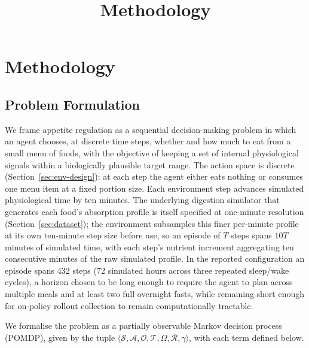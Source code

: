 \documentclass[10pt,twocolumn]{article}
\title{Methodology}
\author{}
\date{}
\begin{document}
\maketitle

\section{Methodology}

\subsection{Problem Formulation}
\label{sec:problem-formulation}

We frame appetite regulation as a sequential decision-making problem in which an agent chooses, at discrete time steps, whether and how much to eat from a small menu of foods, with the objective of keeping a set of internal physiological signals within a biologically plausible target range. The action space is discrete (Section~\ref{sec:env-design}): at each step the agent either eats nothing or consumes one menu item at a fixed portion size. Each environment step advances simulated physiological time by ten minutes. The underlying digestion simulator that generates each food's absorption profile is itself specified at one-minute resolution (Section~\ref{sec:dataset}); the environment subsamples this finer per-minute profile at its own ten-minute step size before use, so an episode of $T$ steps spans $10T$ minutes of simulated time, with each step's nutrient increment aggregating ten consecutive minutes of the raw simulated profile. In the reported configuration an episode spans 432 steps (72 simulated hours across three repeated sleep/wake cycles), a horizon chosen to be long enough to require the agent to plan across multiple meals and at least two full overnight fasts, while remaining short enough for on-policy rollout collection to remain computationally tractable.

We formalise the problem as a partially observable Markov decision process (POMDP), given by the tuple $\langle \mathcal{S}, \mathcal{A}, \mathcal{O}, \mathcal{T}, \Omega, \mathcal{R}, \gamma \rangle$, with each term defined below.
\end{document}
